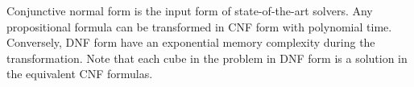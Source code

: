 Conjunctive normal form is the input form of state-of-the-art solvers. Any propositional
formula can be transformed in CNF form with polynomial time. Conversely, DNF form have
an exponential memory complexity during the transformation.
Note that each cube in the problem in DNF form is a solution in the equivalent CNF formulas.


%

